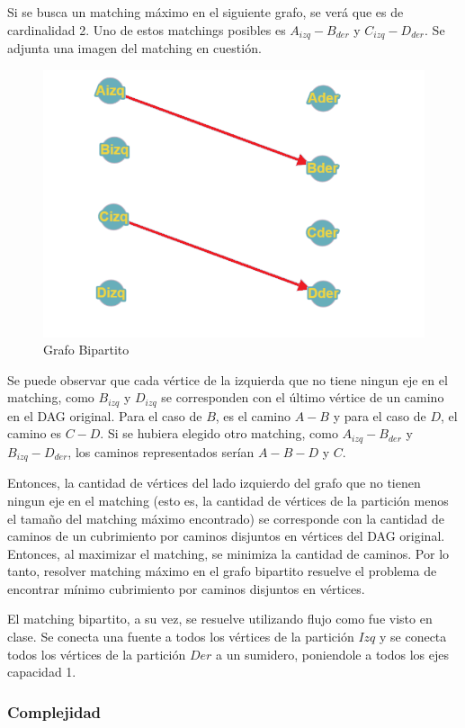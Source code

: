 Si se busca un matching máximo en el siguiente grafo, se verá que es de cardinalidad 2. Uno de estos matchings posibles es $A_{izq} - B_{der}$ y $C_{izq} - D_{der}$. Se adjunta una imagen del matching en cuestión. 

\begin{figure}[H]
\centering
\includegraphics[width=15cm]{Imagenes/Ej2c.png}
\caption{Grafo Bipartito}
\end{figure}

Se puede observar que cada vértice de la izquierda que no tiene ningun eje en el matching, como $B_{izq}$ y $D_{izq}$ se corresponden con el último vértice de un camino en el DAG original. Para el caso de $B$, es el camino $A-B$ y para el caso de $D$, el camino es $C-D$. Si se hubiera elegido otro matching, como $A_{izq} - B_{der}$ y $B_{izq} - D_{der}$, los caminos representados serían $A-B-D$ y $C$.

Entonces, la cantidad de vértices del lado izquierdo del grafo que no tienen ningun eje en el matching (esto es, la cantidad de vértices de la partición menos el tamaño del matching máximo encontrado) se corresponde con la cantidad de caminos de un cubrimiento por caminos disjuntos en vértices del DAG original. Entonces, al maximizar el matching, se minimiza la cantidad de caminos. Por lo tanto, resolver matching máximo en el grafo bipartito resuelve el problema de encontrar mínimo cubrimiento por caminos disjuntos en vértices.

El matching bipartito, a su vez, se resuelve utilizando flujo como fue visto en clase. Se conecta una fuente a todos los vértices de la partición $Izq$ y se conecta todos los vértices de la partición $Der$ a un sumidero, poniendole a todos los ejes capacidad 1.

\subsubsection{Complejidad}
